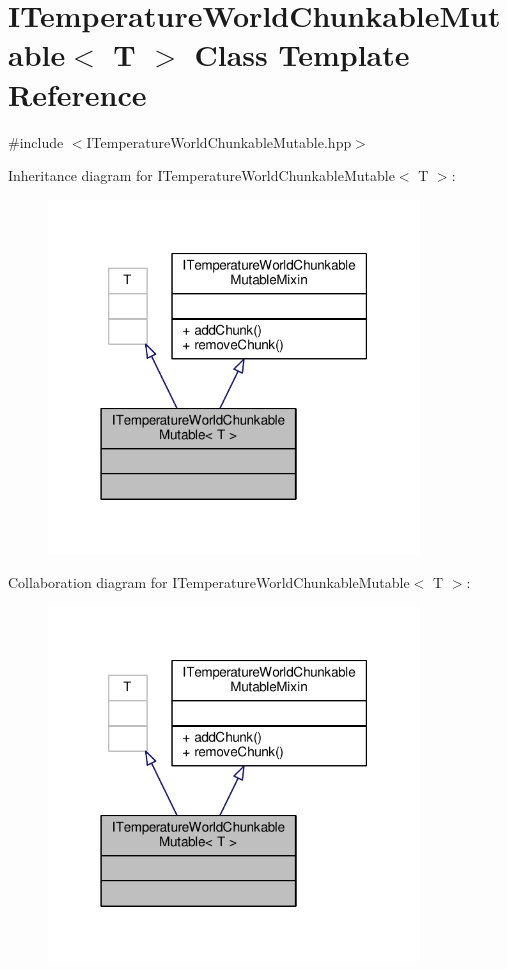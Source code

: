\hypertarget{class_i_temperature_world_chunkable_mutable}{\section{I\-Temperature\-World\-Chunkable\-Mutable$<$ T $>$ Class Template Reference}
\label{class_i_temperature_world_chunkable_mutable}
}


{\ttfamily \#include $<$I\-Temperature\-World\-Chunkable\-Mutable.\-hpp$>$}



Inheritance diagram for I\-Temperature\-World\-Chunkable\-Mutable$<$ T $>$\-:
\nopagebreak
\begin{figure}[H]
\begin{center}
\leavevmode
\includegraphics[width=279pt]{class_i_temperature_world_chunkable_mutable__inherit__graph}
\end{center}
\end{figure}


Collaboration diagram for I\-Temperature\-World\-Chunkable\-Mutable$<$ T $>$\-:
\nopagebreak
\begin{figure}[H]
\begin{center}
\leavevmode
\includegraphics[width=279pt]{class_i_temperature_world_chunkable_mutable__coll__graph}
\end{center}
\end{figure}
